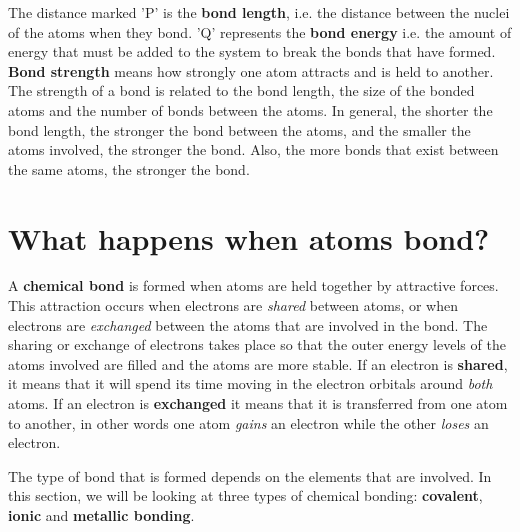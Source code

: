 The distance marked 'P' is the \textbf{bond length}, i.e.\@{} the distance between the nuclei of the atoms when they bond. 'Q' represents the \textbf{bond energy} i.e.\@{} the amount of energy that must be added to the system to break the bonds that have formed. \textbf{Bond strength} means how strongly one atom attracts and is held to another. The strength of a bond is related to the bond length, the size of the bonded atoms and the number of bonds between the atoms. In general, the shorter the bond length, the stronger the bond between the atoms, and the smaller the atoms involved, the stronger the bond. Also, the more bonds that exist between the same atoms, the stronger the bond.\\





\section{What happens when atoms bond?}
\label{sec:bonding:what happens}

A \textbf{chemical bond} is formed when atoms are held together by attractive forces. This attraction occurs when electrons are \textit{shared} between atoms, or when electrons are \textit{exchanged} between the atoms that are involved in the bond. The sharing or exchange of electrons takes place so that the outer energy levels of the atoms involved are filled and the atoms are more stable. If an electron is \textbf{shared}, it means that it will spend its time moving in the electron orbitals around \textit{both} atoms. If an electron is \textbf{exchanged} it means that it is transferred from one atom to another, in other words one atom \textit{gains} an electron while the other \textit{loses} an electron.


The type of bond that is formed depends on the elements that are involved. In this section, we will be looking at three types of chemical bonding: \textbf{covalent}, \textbf{ionic} and \textbf{metallic bonding}.

